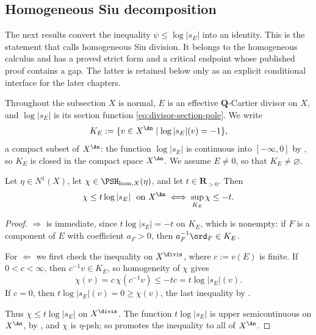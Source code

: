 \subsection{Homogeneous Siu decomposition}
\label{sec:ch35-siu}

The next results convert the inequality $\psi\leq\log|s_E|$ into an
identity.  This is the statement that 
calls homogeneous Siu division.  It belongs to the homogeneous calculus and
has a proved strict form and a critical endpoint whose published proof
contains a gap. The latter is retained below only as an explicit
conditional interface for the later chapters.

Throughout the subsection $X$ is normal, $E$ is an effective
$\mathbf Q$-Cartier divisor on $X$, and $\log|s_E|$ is its section
function \eqref{eq:divisor-section-pole}.  We write
\begin{equation}
\label{eq:ch35-siu-slice}
 K_E:=\{v\in X^{\An}\mid\log|s_E|(v)=-1\},
\end{equation}
a compact subset of $X^{\An}$: the function $\log|s_E|$ is continuous
into $[-\infty,0]$ by , so $K_E$ is
closed in the compact space $X^{\An}$.  We assume $E\neq0$, so that
$K_E\neq\varnothing$.

\begin{lemma}
\label{lem:ch35-slice-to-cone}
Let $\eta\in N^1(X)$, let $\chi\in\PSH_{\mathrm{hom},X}(\eta)$, and let
$t\in\mathbf R_{>0}$.  Then
\begin{equation}
\label{eq:ch35-slice-to-cone}
 \chi\leq t\log|s_E|\ \text{ on }X^{\An}
 \iff
 \sup_{K_E}\chi\leq-t .
\end{equation}
\end{lemma}

\begin{proof}
$\Rightarrow$ is immediate, since $t\log|s_E|=-t$ on $K_E$, which is
nonempty: if $F$ is a component of $E$ with coefficient $a_F>0$, then
$a_F^{-1}\ord_F\in K_E$.

For $\Leftarrow$ we first check the inequality on $X^{\divis}$, where
$c:=v(E)$ is finite.  If $0<c<\infty$, then $c^{-1}v\in K_E$, so
homogeneity of $\chi$ gives
\[
 \chi(v)=c\,\chi(c^{-1}v)\leq-tc=t\log|s_E|(v).
\]
If $c=0$, then $t\log|s_E|(v)=0\geq\chi(v)$, the last inequality by
.

Thus $\chi\leq t\log|s_E|$ on $X^{\divis}$.  The function
$t\log|s_E|$ is upper semicontinuous on $X^{\An}$, by
, and $\chi$ is $\eta$-psh; so
 promotes the inequality to all of
$X^{\An}$.
\end{proof}

